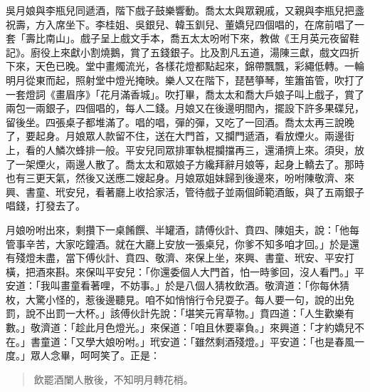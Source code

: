 吳月娘與李瓶兒同遞酒，階下戲子鼓樂響動。喬太太與眾親戚，又親與李瓶兒把盞祝壽，方入席坐下。李桂姐、吳銀兒、韓玉釧兒、董嬌兒四個唱的，在席前唱了一套「壽比南山」。戲子呈上戲文手本，喬五太太吩咐下來，教做《王月英元夜留鞋記》。廚役上來獻小割燒鵝，賞了五錢銀子。比及割凡五道，湯陳三獻，戲文四折下來，天色已晚。堂中畫燭流光，各樣花燈都點起來，錦帶飄飄，彩繩低轉。一輪明月從東而起，照射堂中燈光掩映。樂人又在階下，琵琶箏琴，笙簫笛管，吹打了一套燈詞《畫眉序》「花月滿香城」。吹打畢，喬太太和喬大戶娘子叫上戲子，賞了兩包一兩銀子，四個唱的，每人二錢。月娘又在後邊明間內，擺設下許多果碟兒，留後坐。四張桌子都堆滿了。唱的唱，彈的彈，又吃了一回酒。喬太太再三說晚了，要起身。月娘眾人款留不住，送在大門首，又攔門遞酒，看放煙火。兩邊街上，看的人鱗次蜂排一般。平安兒同眾排軍執棍攔擋再三，還涌擠上來。須臾，放了一架煙火，兩邊人散了。喬太太和眾娘子方纔拜辭月娘等，起身上轎去了。那時也有三更天氣，然後又送應二嫂起身。月娘眾姐妹歸到後邊來，吩咐陳敬濟、來興、書童、玳安兒，看著廳上收拾家活，管待戲子並兩個師範酒飯，與了五兩銀子唱錢，打發去了。

月娘吩咐出來，剩攢下一桌餚饌、半罐酒，請傅伙計、賁四、陳姐夫，說：「他每管事辛苦，大家吃鐘酒。就在大廳上安放一張桌兒，你爹不知多咱才回。」於是還有殘燈未盡，當下傅伙計、賁四、敬濟、來保上坐，來興、書童、玳安、平安打橫，把酒來斟。來保叫平安兒：「你還委個人大門首，怕一時爹回，沒人看門。」平安道：「我叫畫童看著哩，不妨事。」於是八個人猜枚飲酒。敬濟道：「你每休猜枚，大驚小怪的，惹後邊聽見。咱不如悄悄行令兒耍子。每人要一句，說的出免罰，說不出罰一大杯。」該傅伙計先說：「堪笑元宵草物。」賁四道：「人生歡樂有數。」敬濟道：「趁此月色燈光。」來保道：「咱且休要辜負。」來興道：「才約嬌兒不在。」書童道：「又學大娘吩咐。」玳安道：「雖然剩酒殘燈。」平安道：「也是春風一度。」眾人念畢，呵呵笑了。正是：
\begin{quote}
飲罷酒闌人散後，不知明月轉花梢。
\end{quote}
